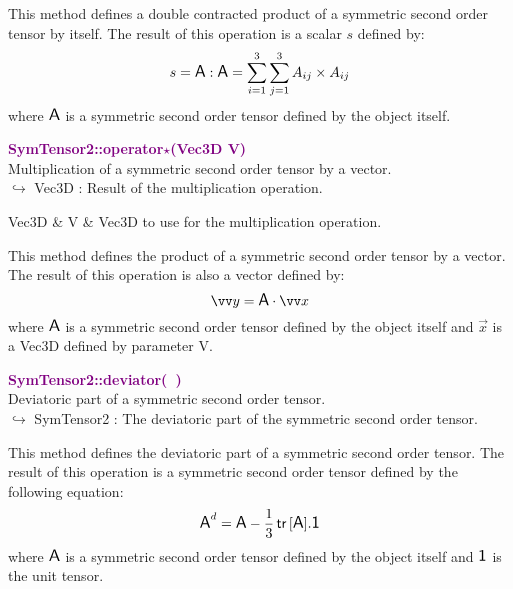 This method defines a double contracted product of a symmetric second order tensor by itself.
The result of this operation is a scalar $s$ defined by:
\begin{equation*}
s = \mbox{\large\ensuremath{\mathsf{A}}} : \mbox{\large\ensuremath{\mathsf{A}}} = \sum_{i=1}^{3} \sum_{j=1}^{3} A_{ij}\times A_{ij}
\end{equation*}
where $\mbox{\large\ensuremath{\mathsf{A}}}$ is a symmetric second order tensor defined by the object itself.

\textcolor{purple}{\textbf{SymTensor2::operator$\star$(Vec3D V)}}\label{SymTensor2::operator*(Vec3D V)}\\
Multiplication of a symmetric second order tensor by a vector.\\ \hspace*{10mm}$\hookrightarrow$ Vec3D : Result of the multiplication operation.

\begin{tcolorbox}[width=\textwidth,myArgs,tabularx={ll|R}]
Vec3D & V & Vec3D to use for the multiplication operation.
\end{tcolorbox}

This method defines the product of a symmetric second order tensor by a vector.
The result of this operation is also a vector defined by:
\begin{equation*}
\overrightarrow{y} = \A \cdot \overrightarrow{x}
\end{equation*}
where $\mbox{\large\ensuremath{\mathsf{A}}}$ is a symmetric second order tensor defined by the object itself and $\overrightarrow{x}$ is a Vec3D defined by parameter V.

\textcolor{purple}{\textbf{SymTensor2::deviator(~)}}\label{SymTensor2::deviator()}\\
Deviatoric part of a symmetric second order tensor.\\ \hspace*{10mm}$\hookrightarrow$ SymTensor2 : The deviatoric part of the symmetric second order tensor.

This method defines the deviatoric part of a symmetric second order tensor.
The result of this operation is a symmetric second order tensor defined by the following equation:
\begin{equation*}
\mbox{\large\ensuremath{\mathsf{A}}}^d=\mbox{\large\ensuremath{\mathsf{A}}}-\frac{1}{3}\mbox{\ensuremath{\mathsf{\,tr\,}}}[\mbox{\large\ensuremath{\mathsf{A}}}].\mbox{\large\ensuremath{\mathsf{1}}}
\end{equation*}
where $\mbox{\large\ensuremath{\mathsf{A}}}$ is a symmetric second order tensor defined by the object itself and $\mbox{\large\ensuremath{\mathsf{1}}}$ is the unit tensor.


